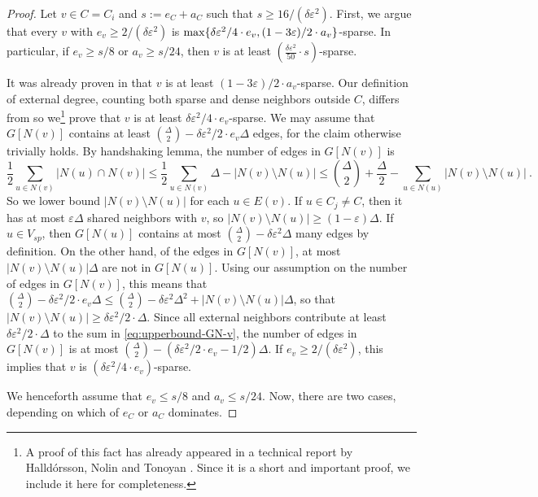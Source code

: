 \documentclass[a4paper,english,11pt]{amsart}
\theoremstyle{definition}
\renewcommand{\leq}{\leqslant}
\renewcommand{\geq}{\geqslant}
\DeclarePairedDelimiter{\set}{\{}{\}}
\newcommand{\eps}{\varepsilon}
\newcommand{\Vsparse}{V_{sp}}
\begin{document}
\begin{proof}
    Let $v\in C = C_i$ and $s := e_C + a_C$ such that $s \geq 16/(\delta\eps^2)$.
    First, we argue that every $v$ with $e_v \geq 2/(\delta\eps^2)$ is $\max\set{\delta \eps^2/4 \cdot e_v, (1-3\eps)/2 \cdot a_v}$-sparse. In particular, if $e_v \geq s/8$ or $a_v \geq s/24$, then $v$ is at least $(\frac{ \delta \eps^2  }{ 50 } \cdot s)$-sparse.
    
    It was already proven in \cite[Lemma 6.2]{HKMT21} that $v$ is at least $(1 - 3\eps)/2 \cdot a_v$-sparse. Our definition of external degree, counting both sparse and dense neighbors outside $C$, differs from \cite{HKMT21} so we\footnote{A proof of this fact has already appeared in a technical report by Halld\'orsson, Nolin and Tonoyan \cite[Lemma 3]{HNT21}. Since it is a short and important proof, we include it here for completeness.} prove that $v$ is at least $\delta\eps^2/4 \cdot e_v$-sparse. We may assume that $G[N(v)]$ contains at least $\binom{\Delta}{2} - \delta\eps^2/2 \cdot e_v \Delta$ edges, for the claim otherwise trivially holds. By handshaking lemma, the number of edges in $G[N(v)]$ is
    \begin{equation}
        \label{eq:upperbound-GN-v}
    \frac{1}{2}\sum_{u\in N(v)} |N(u) \cap N(v)|
    \leq \frac{1}{2}\sum_{u\in N(v)} \Delta - |N(v) \setminus N(u)|
    \leq \binom{\Delta}{2} + \frac{\Delta}{2} - \sum_{u\in N(u)} |N(v) \setminus N(u)| \ .
    \end{equation}
    So we lower bound $|N(v) \setminus N(u)|$ for each $u \in E(v)$. If $u \in C_j \neq C$, then it has at most $\eps\Delta$ shared neighbors with $v$, so $|N(v) \setminus N(u)| \geq (1-\eps)\Delta$. If $u\in \Vsparse$, then $G[N(u)]$ contains at most $\binom{\Delta}{2} - \delta\eps^2\Delta$ many edges by definition. On the other hand, of the edges in $G[N(v)]$, at most $|N(v) \setminus N(u)|\Delta$ are not in $G[N(u)]$. Using our assumption on the number of edges in $G[N(v)]$, this means that $\binom{\Delta}{2} - \delta\eps^2/2 \cdot e_v\Delta \leq \binom{\Delta}{2} - \delta\eps^2 \Delta^2 + |N(v) \setminus N(u)| \Delta$, so that $|N(v) \setminus N(u)| \geq \delta\eps^2/2 \cdot \Delta$. Since all external neighbors contribute at least $\delta\eps^2/2\cdot \Delta$ to the sum in \cref{eq:upperbound-GN-v}, the number of edges in $G[N(v)]$ is at most $\binom{\Delta}{2} - (\delta\eps^2/2 \cdot e_v - 1/2)\Delta$. If $e_v \geq 2/(\delta\eps^2)$, this implies that $v$ is $(\delta\eps^2/4 \cdot e_v)$-sparse.


    We henceforth assume that $e_v \leq s/8$ and $a_v \leq s/24$. Now, there are two cases, depending on which of $e_C$ or $a_C$ dominates.


\end{proof}
\end{document}
